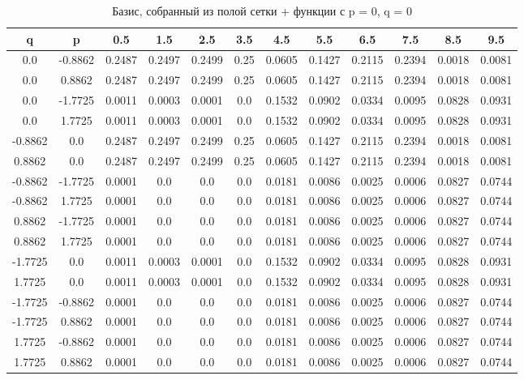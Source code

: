 \documentclass[a4paper,14pt]{extarticle}
\begin{document}
\begin{landscape}
\begin{table}[H]
\centering
\caption{Базис, собранный из полой сетки + функции с p = 0, q = 0}
\begin{tabular}{|c|c|*{10}{c}|}
\hline
q       & p       & 0.5    & 1.5    & 2.5    & 3.5  & 4.5    & 5.5    & 6.5    & 7.5    & 8.5    & 9.5    \\ 
\hline                                                                                                    
0.0     & -0.8862 & 0.2487 & 0.2497 & 0.2499 & 0.25 & 0.0605 & 0.1427 & 0.2115 & 0.2394 & 0.0018 & 0.0081 \\ 
0.0     & 0.8862  & 0.2487 & 0.2497 & 0.2499 & 0.25 & 0.0605 & 0.1427 & 0.2115 & 0.2394 & 0.0018 & 0.0081 \\ 
0.0     & -1.7725 & 0.0011 & 0.0003 & 0.0001 & 0.0  & 0.1532 & 0.0902 & 0.0334 & 0.0095 & 0.0828 & 0.0931 \\ 
0.0     & 1.7725  & 0.0011 & 0.0003 & 0.0001 & 0.0  & 0.1532 & 0.0902 & 0.0334 & 0.0095 & 0.0828 & 0.0931 \\ 
-0.8862 & 0.0     & 0.2487 & 0.2497 & 0.2499 & 0.25 & 0.0605 & 0.1427 & 0.2115 & 0.2394 & 0.0018 & 0.0081 \\ 
0.8862  & 0.0     & 0.2487 & 0.2497 & 0.2499 & 0.25 & 0.0605 & 0.1427 & 0.2115 & 0.2394 & 0.0018 & 0.0081 \\ 
-0.8862 & -1.7725 & 0.0001 & 0.0    & 0.0    & 0.0  & 0.0181 & 0.0086 & 0.0025 & 0.0006 & 0.0827 & 0.0744 \\ 
-0.8862 & 1.7725  & 0.0001 & 0.0    & 0.0    & 0.0  & 0.0181 & 0.0086 & 0.0025 & 0.0006 & 0.0827 & 0.0744 \\ 
0.8862  & -1.7725 & 0.0001 & 0.0    & 0.0    & 0.0  & 0.0181 & 0.0086 & 0.0025 & 0.0006 & 0.0827 & 0.0744 \\ 
0.8862  & 1.7725  & 0.0001 & 0.0    & 0.0    & 0.0  & 0.0181 & 0.0086 & 0.0025 & 0.0006 & 0.0827 & 0.0744 \\ 
-1.7725 & 0.0     & 0.0011 & 0.0003 & 0.0001 & 0.0  & 0.1532 & 0.0902 & 0.0334 & 0.0095 & 0.0828 & 0.0931 \\ 
1.7725  & 0.0     & 0.0011 & 0.0003 & 0.0001 & 0.0  & 0.1532 & 0.0902 & 0.0334 & 0.0095 & 0.0828 & 0.0931 \\ 
-1.7725 & -0.8862 & 0.0001 & 0.0    & 0.0    & 0.0  & 0.0181 & 0.0086 & 0.0025 & 0.0006 & 0.0827 & 0.0744 \\ 
-1.7725 & 0.8862  & 0.0001 & 0.0    & 0.0    & 0.0  & 0.0181 & 0.0086 & 0.0025 & 0.0006 & 0.0827 & 0.0744 \\ 
1.7725  & -0.8862 & 0.0001 & 0.0    & 0.0    & 0.0  & 0.0181 & 0.0086 & 0.0025 & 0.0006 & 0.0827 & 0.0744 \\ 
1.7725  & 0.8862  & 0.0001 & 0.0    & 0.0    & 0.0  & 0.0181 & 0.0086 & 0.0025 & 0.0006 & 0.0827 & 0.0744 \\ 
\hline
\end{tabular}
\end{table} 


\end{landscape}
\end{document}
